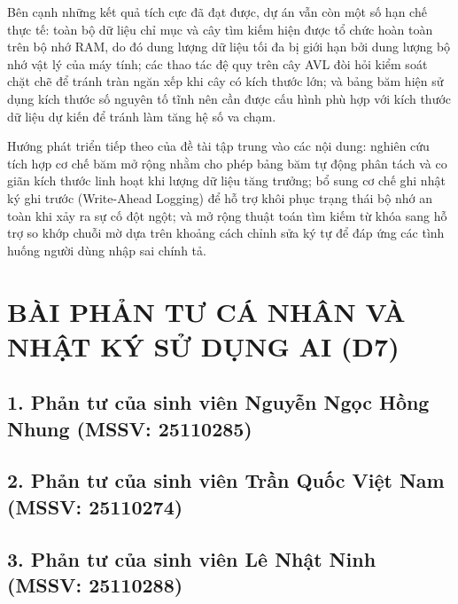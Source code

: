 \documentclass[14pt,a4paper]{extarticle}
\begin{document}
Bên cạnh những kết quả tích cực đã đạt được, dự án vẫn còn một số hạn chế thực tế: toàn bộ dữ liệu chỉ mục và cây tìm kiếm hiện được tổ chức hoàn toàn trên bộ nhớ RAM, do đó dung lượng dữ liệu tối đa bị giới hạn bởi dung lượng bộ nhớ vật lý của máy tính; các thao tác đệ quy trên cây AVL đòi hỏi kiểm soát chặt chẽ để tránh tràn ngăn xếp khi cây có kích thước lớn; và bảng băm hiện sử dụng kích thước số nguyên tố tĩnh nên cần được cấu hình phù hợp với kích thước dữ liệu dự kiến để tránh làm tăng hệ số va chạm.

Hướng phát triển tiếp theo của đề tài tập trung vào các nội dung: nghiên cứu tích hợp cơ chế băm mở rộng nhằm cho phép bảng băm tự động phân tách và co giãn kích thước linh hoạt khi lượng dữ liệu tăng trưởng; bổ sung cơ chế ghi nhật ký ghi trước (Write-Ahead Logging) để hỗ trợ khôi phục trạng thái bộ nhớ an toàn khi xảy ra sự cố đột ngột; và mở rộng thuật toán tìm kiếm từ khóa sang hỗ trợ so khớp chuỗi mờ dựa trên khoảng cách chỉnh sửa ký tự để đáp ứng các tình huống người dùng nhập sai chính tả.

\newpage
\section*{BÀI PHẢN TƯ CÁ NHÂN VÀ NHẬT KÝ SỬ DỤNG AI (D7)}

\subsection*{1. Phản tư của sinh viên Nguyễn Ngọc Hồng Nhung (MSSV: 25110285)}

\vspace{2.5cm}

\subsection*{2. Phản tư của sinh viên Trần Quốc Việt Nam (MSSV: 25110274)}

\vspace{2.5cm}

\subsection*{3. Phản tư của sinh viên Lê Nhật Ninh (MSSV: 25110288)}
\end{document}
